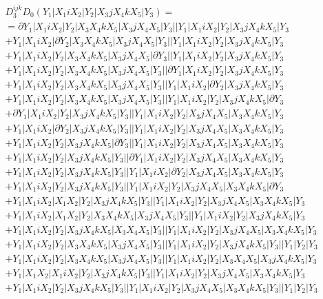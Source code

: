 \documentclass{article}[12pt]
\begin{document}
\begin{align*}
& D_3^{ijk}D_0(Y_1|X_1iX_2|Y_2|X_3jX_4kX_5|Y_3) =\\
& =\partial Y_1|X_1iX_2|Y_2|X_3X_4kX_5|X_3jX_4X_5|Y_3||Y_1|X_1iX_2|Y_2|X_3jX_4kX_5|Y_3\\
& +Y_1|X_1iX_2|\partial Y_2|X_3X_4kX_5|X_3jX_4X_5|Y_3||Y_1|X_1iX_2|Y_2|X_3jX_4kX_5|Y_3\\
& +Y_1|X_1iX_2|Y_2|X_3X_4kX_5|X_3jX_4X_5|\partial Y_3||Y_1|X_1iX_2|Y_2|X_3jX_4kX_5|Y_3\\
& +Y_1|X_1iX_2|Y_2|X_3X_4kX_5|X_3jX_4X_5|Y_3||\partial Y_1|X_1iX_2|Y_2|X_3jX_4kX_5|Y_3\\
& +Y_1|X_1iX_2|Y_2|X_3X_4kX_5|X_3jX_4X_5|Y_3||Y_1|X_1iX_2|\partial Y_2|X_3jX_4kX_5|Y_3\\
& +Y_1|X_1iX_2|Y_2|X_3X_4kX_5|X_3jX_4X_5|Y_3||Y_1|X_1iX_2|Y_2|X_3jX_4kX_5|\partial Y_3\\
& +\partial Y_1|X_1iX_2|Y_2|X_3jX_4kX_5|Y_3||Y_1|X_1iX_2|Y_2|X_3jX_4X_5|X_3X_4kX_5|Y_3\\
& +Y_1|X_1iX_2|\partial Y_2|X_3jX_4kX_5|Y_3||Y_1|X_1iX_2|Y_2|X_3jX_4X_5|X_3X_4kX_5|Y_3\\
& +Y_1|X_1iX_2|Y_2|X_3jX_4kX_5|\partial Y_3||Y_1|X_1iX_2|Y_2|X_3jX_4X_5|X_3X_4kX_5|Y_3\\
& +Y_1|X_1iX_2|Y_2|X_3jX_4kX_5|Y_3||\partial Y_1|X_1iX_2|Y_2|X_3jX_4X_5|X_3X_4kX_5|Y_3\\
& +Y_1|X_1iX_2|Y_2|X_3jX_4kX_5|Y_3||Y_1|X_1iX_2|\partial Y_2|X_3jX_4X_5|X_3X_4kX_5|Y_3\\
& +Y_1|X_1iX_2|Y_2|X_3jX_4kX_5|Y_3||Y_1|X_1iX_2|Y_2|X_3jX_4X_5|X_3X_4kX_5|\partial Y_3\\
& +Y_1|X_1iX_2|X_1X_2|Y_2|X_3jX_4kX_5|Y_3||Y_1|X_1iX_2|Y_2|X_3jX_4X_5|X_3X_4kX_5|Y_3\\ 
 & +Y_1|X_1iX_2|X_1X_2|Y_2|X_3X_4kX_5|X_3jX_4X_5|Y_3||Y_1|X_1iX_2|Y_2|X_3jX_4kX_5|Y_3\\ 
 & +Y_1|X_1iX_2|Y_2|X_3jX_4kX_5|X_3X_4X_5|Y_3||Y_1|X_1iX_2|Y_2|X_3jX_4X_5|X_3X_4kX_5|Y_3\\ 
 & +Y_1|X_1iX_2|Y_2|X_3X_4kX_5|X_3jX_4X_5|Y_3||Y_1|X_1iX_2|Y_2|X_3jX_4kX_5|Y_3||Y_1|Y_2|Y_3\\ 
 & +Y_1|X_1iX_2|Y_2|X_3X_4kX_5|X_3jX_4X_5|Y_3||Y_1|X_1iX_2|Y_2|X_3X_4X_5|X_3jX_4kX_5|Y_3\\ 
 & +Y_1|X_1X_2|X_1iX_2|Y_2|X_3jX_4kX_5|Y_3||Y_1|X_1iX_2|Y_2|X_3jX_4X_5|X_3X_4kX_5|Y_3\\ 
 & +Y_1|X_1iX_2|Y_2|X_3jX_4kX_5|Y_3||Y_1|X_1iX_2|Y_2|X_3jX_4X_5|X_3X_4kX_5|Y_3||Y_1|Y_2|Y_3\\ 

\end{align*}
\end{document}
